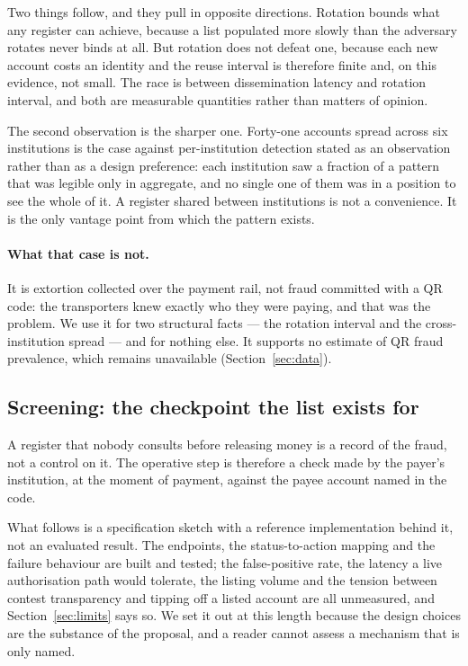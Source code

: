 \documentclass[10pt,a4paper,twocolumn]{article}
\begin{document}
Two things follow, and they pull in opposite directions. Rotation bounds what
any register can achieve, because a list populated more slowly than the
adversary rotates never binds at all. But rotation does not defeat one, because
each new account costs an identity and the reuse interval is therefore finite
and, on this evidence, not small. The race is between dissemination latency and
rotation interval, and both are measurable quantities rather than matters of
opinion.

The second observation is the sharper one. Forty-one accounts spread across six
institutions is the case against per-institution detection stated as an
observation rather than as a design preference: each institution saw a fraction
of a pattern that was legible only in aggregate, and no single one of them was
in a position to see the whole of it. A register shared between institutions is
not a convenience. It is the only vantage point from which the pattern exists.

\paragraph{What that case is not.} It is extortion collected over the payment
rail, not fraud committed with a QR code: the transporters knew exactly who they
were paying, and that was the problem. We use it for two structural facts --- the
rotation interval and the cross-institution spread --- and for nothing else. It
supports no estimate of QR fraud prevalence, which remains unavailable
(Section~\ref{sec:data}).

\subsection{Screening: the checkpoint the list exists for}
\label{sec:screening}

A register that nobody consults before releasing money is a record of the fraud,
not a control on it. The operative step is therefore a check made by the payer's
institution, at the moment of payment, against the payee account named in the
code.

What follows is a specification sketch with a reference implementation behind
it, not an evaluated result. The endpoints, the status-to-action mapping and the
failure behaviour are built and tested; the false-positive rate, the latency a
live authorisation path would tolerate, the listing volume and the tension
between contest transparency and tipping off a listed account are all
unmeasured, and Section~\ref{sec:limits} says so. We set it out at this length
because the design choices are the substance of the proposal, and a reader
cannot assess a mechanism that is only named.
\end{document}
